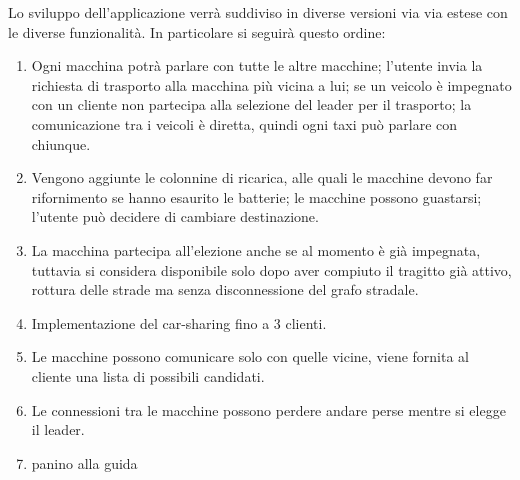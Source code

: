 Lo sviluppo dell'applicazione verrà suddiviso in diverse versioni via via estese con le diverse funzionalità. In particolare si seguirà questo ordine:
\begin{enumerate}
	\item Ogni macchina potrà parlare con tutte le altre macchine; l'utente invia la richiesta di trasporto alla macchina più vicina a lui; se un veicolo è impegnato con un cliente non partecipa alla selezione del leader per il trasporto; la comunicazione tra i veicoli è diretta, quindi ogni taxi può parlare con chiunque.
	\item Vengono aggiunte le colonnine di ricarica, alle quali le macchine devono far rifornimento se hanno esaurito le batterie; le macchine possono guastarsi; l'utente può decidere di cambiare destinazione.
	\item La macchina partecipa all'elezione anche se al momento è già impegnata, tuttavia si considera disponibile solo dopo aver compiuto il tragitto già attivo, rottura delle strade ma senza disconnessione del grafo stradale.
	\item Implementazione del car-sharing fino a 3 clienti.
	\item Le macchine possono comunicare solo con quelle vicine, viene fornita al cliente una lista di possibili candidati.
	\item Le connessioni tra le macchine possono perdere andare perse mentre si elegge il leader.
	\item panino alla guida
\end{enumerate}